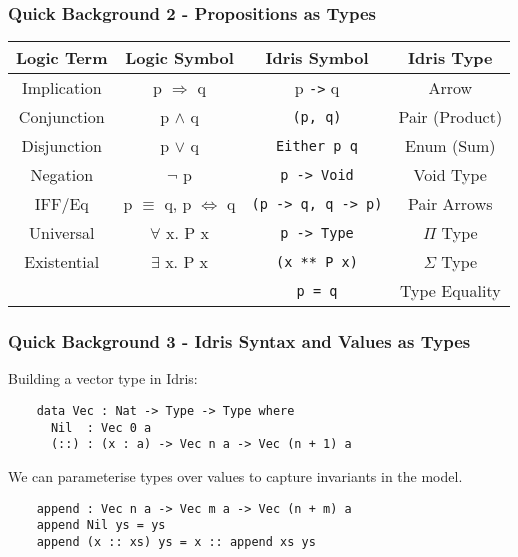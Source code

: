 \documentclass{beamer}
\begin{document}
\begin{frame}[fragile]
  \frametitle{Quick Background 2 - Propositions as Types}
     \begin{table}[h!]
    \begin{tabular}{c|c|c|c}
    \textbf{Logic Term} & \textbf{Logic Symbol} & \textbf{Idris Symbol}
      & \textbf{Idris Type} \\
    \hline
      Implication & p $\Rightarrow$ q & p \texttt{->} q
      & Arrow \\
      Conjunction & p $\land$ q & \texttt{(p, q)} 
      & Pair (Product) \\
      Disjunction & p $\lor$ q & \texttt{Either p q}
      & Enum (Sum)\\
      Negation & $\lnot$ p & \texttt{p -> Void} &
      Void Type \\
      IFF/Eq & p $\equiv$ q, p $\iff$ q & \texttt{(p -> q, q -> p)} 
      & Pair Arrows \\
      Universal & $\forall$ x. P x & 
      \texttt{p -> Type} & $\Pi$ Type \\
      Existential & $\exists$ x. P x 
      & \texttt{(x ** P x)} & $\Sigma$ Type \\
      \hline
       & & \texttt{p = q} & Type Equality
    \end{tabular}
  \end{table}
\end{frame}

\begin{frame}[fragile]
  \frametitle{Quick Background 3 - Idris Syntax and Values as Types}
  Building a vector type in Idris: 
  \begin{verbatim}
    data Vec : Nat -> Type -> Type where
      Nil  : Vec 0 a
      (::) : (x : a) -> Vec n a -> Vec (n + 1) a
  \end{verbatim}
  We can parameterise types over values to capture invariants in the model.
  \begin{verbatim}
    append : Vec n a -> Vec m a -> Vec (n + m) a
    append Nil ys = ys
    append (x :: xs) ys = x :: append xs ys 
  \end{verbatim}
\end{frame}

\end{document}
